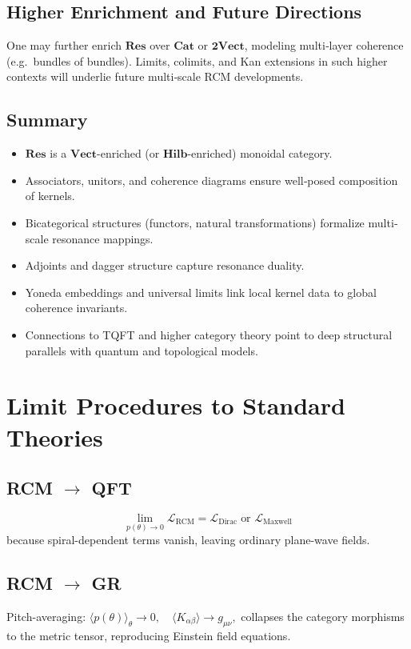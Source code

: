 \subsection{Higher Enrichment and Future Directions}

One may further enrich \(\mathbf{Res}\) over \(\mathbf{Cat}\) or \(\mathbf{2Vect}\), modeling multi‐layer coherence (e.g.\ bundles of bundles).  Limits, colimits, and Kan extensions in such higher contexts will underlie future multi‐scale RCM developments.

\subsection*{Summary}

\begin{itemize}
  \item \(\mathbf{Res}\) is a \(\mathbf{Vect}\)-enriched (or \(\mathbf{Hilb}\)-enriched) monoidal category.
  \item Associators, unitors, and coherence diagrams ensure well‐posed composition of kernels.
  \item Bicategorical structures (functors, natural transformations) formalize multi‐scale resonance mappings.
  \item Adjoints and dagger structure capture resonance duality.
  \item Yoneda embeddings and universal limits link local kernel data to global coherence invariants.
  \item Connections to TQFT and higher category theory point to deep structural parallels with quantum and topological models.
\end{itemize}

\section{Limit Procedures to Standard Theories}

\subsection*{RCM \(\rightarrow\) QFT}
\[
\lim_{p(\theta)\to 0} \mathcal{L}_{\text{RCM}}
   = \mathcal{L}_{\text{Dirac}} \; \text{or }\mathcal{L}_{\text{Maxwell}}
\]
because spiral-dependent terms vanish, leaving ordinary plane-wave fields.

\subsection{RCM \(\rightarrow\) GR}
Pitch-averaging:
\(
\langle p(\theta)\rangle_\theta \to 0,
\quad
\langle K_{\alpha\beta}\rangle \to g_{\mu\nu},
\)
collapses the category morphisms to the metric tensor, reproducing Einstein
field equations.

